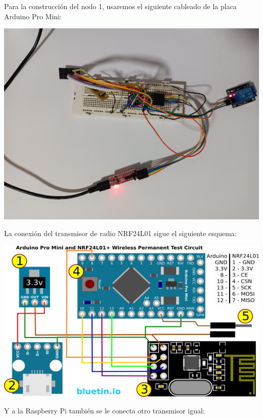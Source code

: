 Para la construcción del nodo 1, usaremos el siguiente cableado de la placa
Arduino Pro Mini:

\includegraphics[width=\linewidth]{nodo1/nodo1-wiring.jpg}

La conexión del transmisor de radio NRF24L01 sigue el siguiente esquema:

\includegraphics[width=\linewidth]{arduino-nrf24l01-wiring.jpg}

Y a la Raspberry Pi también se le conecta otro transmisor igual:

